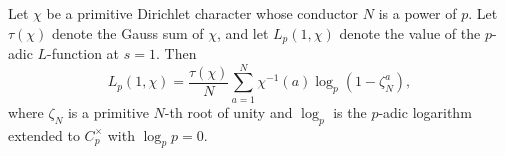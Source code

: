 Let $\chi$ be a primitive Dirichlet character whose conductor $N$ is a power of $p$. Let $\tau(\chi)$ denote the Gauss sum of $\chi$, and let $L_p(1,\chi)$ denote the value of the $p$-adic $L$-function at $s=1$. Then
$$
L_p(1,\chi) = \frac{\tau(\chi)}{N} \sum_{a=1}^{N} \chi^{-1}(a) \log_p(1 - \zeta_N^a),
$$
where $\zeta_N$ is a primitive $N$-th root of unity and $\log_p$ is the $p$-adic logarithm extended to $C_p^\times$ with $\log_p p = 0$.
